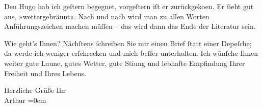 \pstart
           Den Hugo hab ich geſtern begegnet, vorgeſtern
               iſt er zurückgeko{\geminationm}en. Er{ }ſieht gut aus,
               »wettergebräunt«. Nach und nach wird man zu allen Worten Anführungszeichen {\pb}machen müſſen – das wird dann das Ende der Literatur
               sein.\pend
           
\pstart
           Wie geht’s Ihnen? Nächſtens{ }ſchreiben Sie mir einen Brief{ }ſtatt einer Depeſche; da
               werde ich weniger erſchrecken und mich beſſer unterhalten. Ich wünſche Ihnen weiter
               gute Laune, {\pb}gutes Wetter, gute Sti{\geminationm}ung und lebhafte Empfindung Ihrer Freiheit und Ihres
               Lebens.\pend
           
\pstart
           Herzliche Grüße Ihr{\\[\baselineskip]}\spacefill\mbox{Arthur}\pend
           \leftskip=0em{}\endnumbering{}  \newcommand{\dateiname}{L00489}\newcommand{\titel}{Arthur Schnitzler an Richard Beer-Hofmann, 21. 9. 1895}\newcommand{\editorInnen}{Martin Anton Müller und Gerd-Hermann Susen}
